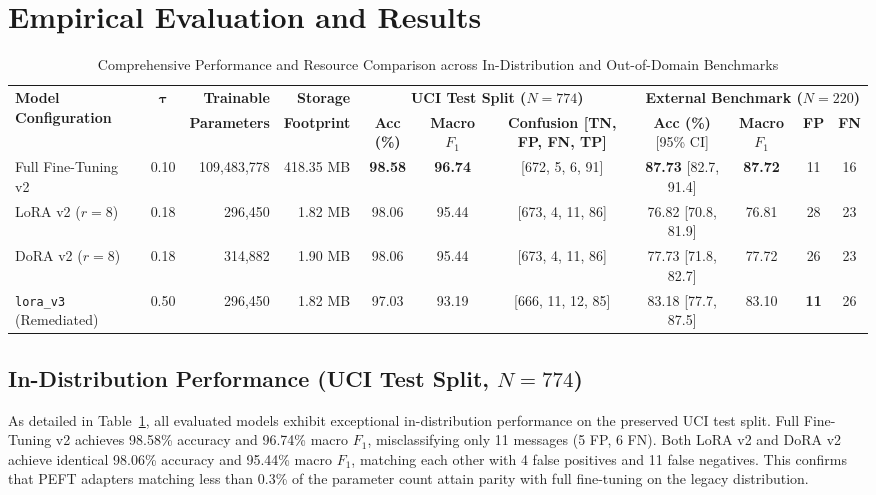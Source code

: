 \documentclass[conference]{IEEEtran}
\begin{document}
\section{Empirical Evaluation and Results}
\label{sec:results}

\begin{table}[t]
\centering
\caption{Comprehensive Performance and Resource Comparison across In-Distribution and Out-of-Domain Benchmarks}
\label{tab:main_results}
\small
\setlength{\tabcolsep}{3.2pt}
\begin{tabular}{l c r r c c c c c c c}
\toprule
\multirow{2}{*}{\textbf{Model Configuration}} & \multirow{2}{*}{$\boldsymbol{\tau}$} & \textbf{Trainable} & \textbf{Storage} & \multicolumn{3}{c}{\textbf{UCI Test Split ($N=774$)}} & \multicolumn{4}{c}{\textbf{External Benchmark ($N=220$)}} \\
\cmidrule(lr){5-7} \cmidrule(lr){8-11}
& & \textbf{Parameters} & \textbf{Footprint} & \textbf{Acc (\%)} & \textbf{Macro $F_1$} & \textbf{Confusion [TN, FP, FN, TP]} & \textbf{Acc (\%)} [95\% CI] & \textbf{Macro $F_1$} & \textbf{FP} & \textbf{FN} \\
\midrule
Full Fine-Tuning v2 & 0.10 & 109,483,778 & 418.35 MB & \textbf{98.58} & \textbf{96.74} & [672, 5, 6, 91] & \textbf{87.73} [82.7, 91.4] & \textbf{87.72} & 11 & 16 \\
LoRA v2 ($r=8$) & 0.18 & 296,450 & 1.82 MB & 98.06 & 95.44 & [673, 4, 11, 86] & 76.82 [70.8, 81.9] & 76.81 & 28 & 23 \\
DoRA v2 ($r=8$) & 0.18 & 314,882 & 1.90 MB & 98.06 & 95.44 & [673, 4, 11, 86] & 77.73 [71.8, 82.7] & 77.72 & 26 & 23 \\
\texttt{lora\_v3} (Remediated) & 0.50 & 296,450 & 1.82 MB & 97.03 & 93.19 & [666, 11, 12, 85] & 83.18 [77.7, 87.5] & 83.10 & \textbf{11} & 26 \\
\bottomrule
\end{tabular}
\vspace{-2mm}
\end{table}

\subsection{In-Distribution Performance (UCI Test Split, $N=774$)}
As detailed in Table~\ref{tab:main_results}, all evaluated models exhibit exceptional in-distribution performance on the preserved UCI test split. Full Fine-Tuning v2 achieves 98.58\% accuracy and 96.74\% macro $F_1$, misclassifying only 11 messages (5 FP, 6 FN). Both LoRA v2 and DoRA v2 achieve identical 98.06\% accuracy and 95.44\% macro $F_1$, matching each other with 4 false positives and 11 false negatives. This confirms that PEFT adapters matching less than 0.3\% of the parameter count attain parity with full fine-tuning on the legacy distribution.
\end{document}
